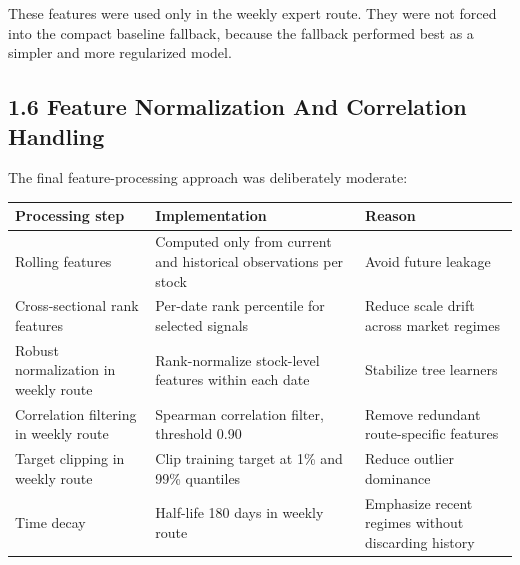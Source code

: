 \documentclass[11pt]{article}
\begin{document}
These features were used only in the weekly expert route. They were not
forced into the compact baseline fallback, because the fallback
performed best as a simpler and more regularized model.

\subsection{1.6 Feature Normalization And Correlation
Handling}\label{feature-normalization-and-correlation-handling}

The final feature-processing approach was deliberately moderate:

\begin{longtable}[]{@{}|
  >{\RaggedRight\arraybackslash}m{}|
  >{\RaggedRight\arraybackslash}m{}|
  >{\RaggedRight\arraybackslash}m{}|@{}}
\hline\rowcolor{tableHead}
\begin{minipage}[c]{\linewidth}\centering\bfseries
Processing step
\end{minipage} & \begin{minipage}[c]{\linewidth}\centering\bfseries
Implementation
\end{minipage} & \begin{minipage}[c]{\linewidth}\centering\bfseries
Reason
\end{minipage} \\
\hline
\endhead
\hline
\endlastfoot
Rolling features & Computed only from current and historical
observations per stock & Avoid future leakage \\
\hline
Cross-sectional rank features & Per-date rank percentile for selected
signals & Reduce scale drift across market regimes \\
\hline
Robust normalization in weekly route & Rank-normalize stock-level
features within each date & Stabilize tree learners \\
\hline
Correlation filtering in weekly route & Spearman correlation filter,
threshold 0.90 & Remove redundant route-specific features \\
\hline
Target clipping in weekly route & Clip training target at 1\% and 99\%
quantiles & Reduce outlier dominance \\
\hline
Time decay & Half-life 180 days in weekly route & Emphasize recent
regimes without discarding history \\
\end{longtable}
\end{document}
